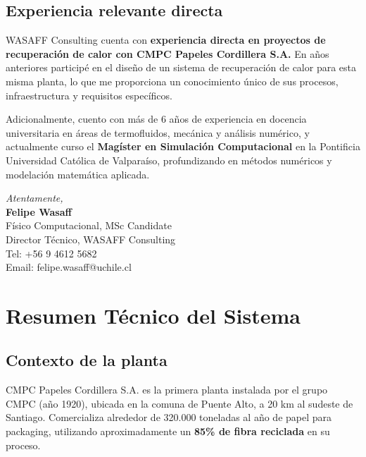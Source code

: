 \documentclass[11pt,a4paper]{article}
\begin{document}
\subsection{Experiencia relevante directa}

WASAFF Consulting cuenta con \textbf{experiencia directa en proyectos de recuperación de calor con CMPC Papeles Cordillera S.A.} En años anteriores participé en el diseño de un sistema de recuperación de calor para esta misma planta, lo que me proporciona un conocimiento único de sus procesos, infraestructura y requisitos específicos.

Adicionalmente, cuento con más de 6 años de experiencia en docencia universitaria en áreas de termofluidos, mecánica y análisis numérico, y actualmente curso el \textbf{Magíster en Simulación Computacional} en la Pontificia Universidad Católica de Valparaíso, profundizando en métodos numéricos y modelación matemática aplicada.

\vspace{1cm}

\begin{flushright}
\textit{Atentamente,}\\[0.5cm]
\textbf{Felipe Wasaff}\\
Físico Computacional, MSc Candidate\\
Director Técnico, WASAFF Consulting\\
Tel: +56 9 4612 5682\\
Email: felipe.wasaff@uchile.cl
\end{flushright}

\newpage

\section{Resumen Técnico del Sistema}

\subsection{Contexto de la planta}

CMPC Papeles Cordillera S.A. es la primera planta instalada por el grupo CMPC (año 1920), ubicada en la comuna de Puente Alto, a 20 km al sudeste de Santiago. Comercializa alrededor de 320.000 toneladas al año de papel para packaging, utilizando aproximadamente un \textbf{85\% de fibra reciclada} en su proceso.
\end{document}
